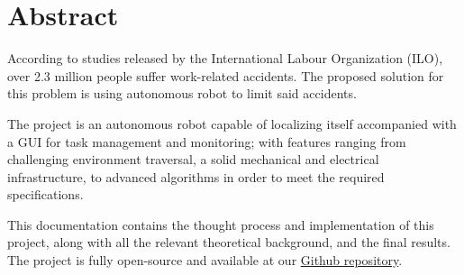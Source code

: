\chapter*{Abstract}

According to studies released by the International Labour Organization (ILO), over 2.3 million people suffer work-related accidents. The proposed solution for this problem is using autonomous robot to limit said accidents.

The project is an autonomous robot capable of localizing itself accompanied with a GUI for task management and monitoring; with features ranging from challenging environment traversal, a solid mechanical and electrical infrastructure, to advanced algorithms in order to meet the required specifications. 

This documentation contains the thought process and implementation of this project, along with all the relevant theoretical background, and the final results. The project is fully open-source and available at our \href{https://github.com/orgs/meh-land/repositories}{\color{blue2}Github repository}.



